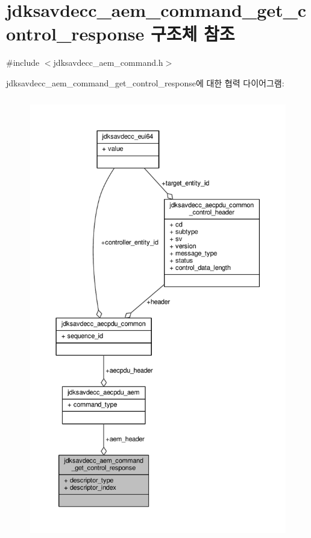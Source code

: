 \hypertarget{structjdksavdecc__aem__command__get__control__response}{}\section{jdksavdecc\+\_\+aem\+\_\+command\+\_\+get\+\_\+control\+\_\+response 구조체 참조}
\label{structjdksavdecc__aem__command__get__control__response}


{\ttfamily \#include $<$jdksavdecc\+\_\+aem\+\_\+command.\+h$>$}



jdksavdecc\+\_\+aem\+\_\+command\+\_\+get\+\_\+control\+\_\+response에 대한 협력 다이어그램\+:
\nopagebreak
\begin{figure}[H]
\begin{center}
\leavevmode
\includegraphics[height=550pt]{structjdksavdecc__aem__command__get__control__response__coll__graph}
\end{center}
\end{figure}
